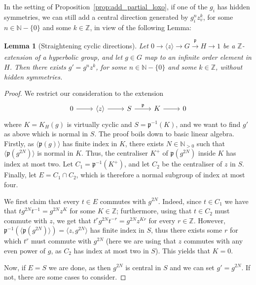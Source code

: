 \documentclass[svgnames]{amsart}
\theoremstyle{plain}
\newtheorem{lemma}[thm]{Lemma}
\theoremstyle{definition}
\newcommand{\Z}{\mathbb{Z}}
\newcommand{\p}{\mathfrak{p}}
\begin{document}
In the setting of Proposition~\ref{prop:add_partial_loxo}, if one of the $g_i$ has hidden symmetries, we can still add a central direction generated by $g_i^nz_v^k$, for some $n\in\mathbb{N}-\{0\}$ and some $k\in \Z$, in view of the following Lemma:
\begin{lemma}[Straightening cyclic directions]\label{lem:straightening_central_direction}
Let $0\to \langle z\rangle\to G\xrightarrow[]{\p} H\to 1$ be a $\Z$-extension of a hyperbolic group, and let $g\in G$ map to an infinite order element in $H$. Then there exists $g'=g^nz^k$, for some $n\in\mathbb{N}-\{0\}$ and some $k\in \Z$, without hidden symmetries.
\end{lemma}

\begin{proof} 
    We restrict our consideration to the extension
    $$\begin{tikzcd}
        0\ar{r}&\langle z\rangle\ar{r}&S\ar{r}{\p}&K\ar{r}&0
    \end{tikzcd}$$
    where $K=K_{H}(g)$ is virtually cyclic and $S=\p^{-1}(K)$, and we want to find $g'$ as above which is normal in $S$. The proof boils down to basic linear algebra. Firstly, as $\langle\p(g)\rangle$ has finite index in $K$, there exists $N\in\mathbb{N}_{>0}$ such that $\langle \p(g^{2N})\rangle$ is normal in $K$. Thus, the centraliser $K^+$ of $\p(g^{2N})$ inside $K$ has index at most two. Let $C_1=\p^{-1}\left(K^+\right)$, and let $C_2$ be the centraliser of $z$ in $S$. Finally, let $E=C_1\cap C_2$, which is therefore a normal subgroup of index at most four. 

We first claim that every $t\in E$ commutes with $g^{2N}$. Indeed, since $t\in C_1$ we have that $tg^{2N}t^{-1}=g^{2N} z^K$ for some $K\in\Z$; furthermore, using that $t\in C_2$ must commute with $z$, we get that $t^rg^{2N}t^{-r}=g^{2N}z^{Kr}$ for every $r\in \Z$. However, $\p^{-1}(\langle \p(g^{2N})\rangle)=\langle z, g^{2N}\rangle$ has finite index in $S$, thus there exists some $r$ for which $t^r$ must commute with $g^{2N}$ (here we are using that $z$ commutes with any even power of $g$, as $C_2$ has index at most two in $S$). This yields that $K=0$.

Now, if $E=S$ we are done, as then $g^{2N}$ is central in $S$ and we can set $g'=g^{2N}$. If not, there are some cases to consider.


\end{proof}
\end{document}
